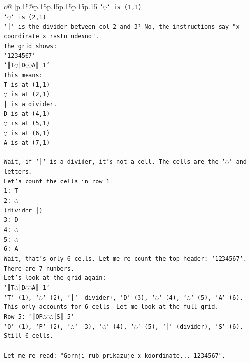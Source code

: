 \documentclass{article}
\begin{document}
{\begin{supertabular}{c@{$\;$}|p{.15\linewidth}@{}p{.15\linewidth}p{.15\linewidth}p{.15\linewidth}p{.15\linewidth}p{.15\linewidth}}
{{{\texttt{`◌` is (1,1)} \\
\texttt{`◌` is (2,1)} \\
\texttt{`│` is the divider between col 2 and 3? No, the instructions say "x{-}coordinate x rastu udesno".} \\
\texttt{The grid shows:} \\
\texttt{`1234567`} \\
\texttt{`║T◌│D◌◌A║ 1`} \\
\texttt{This means:} \\
\texttt{T is at (1,1)} \\
\texttt{◌ is at (2,1)} \\
\texttt{│ is a divider.} \\
\texttt{D is at (4,1)} \\
\texttt{◌ is at (5,1)} \\
\texttt{◌ is at (6,1)} \\
\texttt{A is at (7,1)} \\
\\ 
\texttt{Wait, if `│` is a divider, it's not a cell. The cells are the `◌` and letters.} \\
\texttt{Let's count the cells in row 1:} \\
\texttt{1: T} \\
\texttt{2: ◌} \\
\texttt{(divider │)} \\
\texttt{3: D} \\
\texttt{4: ◌} \\
\texttt{5: ◌} \\
\texttt{6: A} \\
\texttt{Wait, that's only 6 cells. Let me re{-}count the top header: `1234567`. There are 7 numbers.} \\
\texttt{Let's look at the grid again:} \\
\texttt{`║T◌│D◌◌A║ 1`} \\
\texttt{`T` (1), `◌` (2), `│` (divider), `D` (3), `◌` (4), `◌` (5), `A` (6).} \\
\texttt{This only accounts for 6 cells. Let me look at the full grid.} \\
\texttt{Row 5: `║OP◌◌◌│S║ 5`} \\
\texttt{`O` (1), `P` (2), `◌` (3), `◌` (4), `◌` (5), `│` (divider), `S` (6).} \\
\texttt{Still 6 cells.} \\
\\ 
\texttt{Let me re{-}read: "Gornji rub prikazuje x{-}koordinate... 1234567".} \\
}}}
\end{supertabular}}
\end{document}
